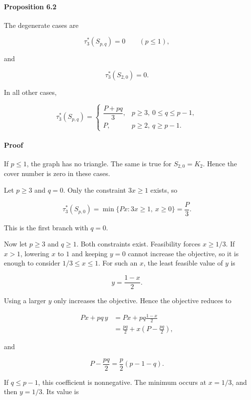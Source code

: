 \documentclass[
  american,
  11pt,
  a4paper,
]{article}
\begin{document}
\paragraph{Proposition 6.2}\label{proposition-6.2}

The degenerate cases are

\[
\tau_3^*(S_{p,q})=0
\qquad
(p\le1),
\]

and

\[
\tau_3^*(S_{2,0})=0.
\]

In all other cases,

\[
\boxed{
\tau_3^*(S_{p,q})
=
\begin{cases}
\dfrac{P+pq}{3},
& p\ge3,\ 0\le q\le p-1,\\[3mm]
P,
& p\ge2,\ q\ge p-1.
\end{cases}
}
\]

\paragraph{Proof}\label{proof-9}

If \(p\le1\), the graph has no triangle. The same is true for \(S_{2,0}=K_2\). Hence the cover number is zero in these cases.

Let \(p\ge3\) and \(q=0\). Only the constraint \(3x\ge1\) exists, so

\[
\tau_3^*(S_{p,0})
=
\min\{Px:3x\ge1,\ x\ge0\}
=
\frac P3.
\]

This is the first branch with \(q=0\).

Now let \(p\ge3\) and \(q\ge1\). Both constraints exist. Feasibility forces \(x\ge1/3\). If \(x>1\), lowering \(x\) to \(1\) and keeping \(y=0\) cannot increase the objective, so it is enough to consider \(1/3\le x\le1\). For such an \(x\), the least feasible value of \(y\) is

\[
y=\frac{1-x}{2}.
\]

Using a larger \(y\) only increases the objective. Hence the objective reduces to

\[
\begin{aligned}
Px+pq\,y
&=
Px+pq\frac{1-x}{2}\\
&=
\frac{pq}{2}
+
x\left(P-\frac{pq}{2}\right),
\end{aligned}
\]

and

\[
P-\frac{pq}{2}
=
\frac p2(p-1-q).
\]

If \(q\le p-1\), this coefficient is nonnegative. The minimum occurs at \(x=1/3\), and then \(y=1/3\). Its value is
\end{document}
